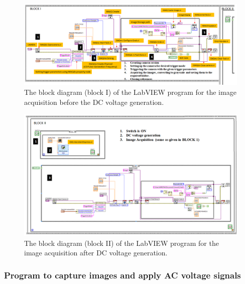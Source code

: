 \documentclass[journal=jacsat,manuscript=article]{achemso}
\begin{document}
\begin{figure}[H]
	\centering
	\includegraphics[width=1.3\linewidth,angle=90 ]{Block_1.png}
	\caption{The block diagram (block I) of the LabVIEW program for the image acquisition before the DC voltage generation.}
	\label{fig:ex4}
\end{figure}

\begin{figure}[H]
	\centering
	\includegraphics[width=1.3\linewidth,angle=90]{Block_2.png}
	\caption{The block diagram (block II) of the LabVIEW program for the image acquisition after DC voltage generation.}
	\label{fig:ex5}
\end{figure}

 
\subsubsection{Program to capture images and apply AC voltage signals}
\end{document}
